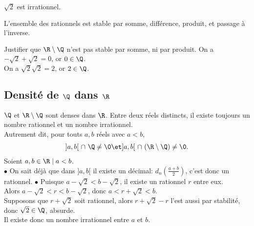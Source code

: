 \documentclass[11pt]{article}
\begin{document}
\vspace*{-0.5cm}

\begin{prop}{}{}
    $\sqrt{2}$ est irrationnel.
\end{prop}

\vspace*{-0.5cm}

\begin{prop}{}{}
    L'ensemble des rationnels est stable par somme, différence, produit, et passage à l'inverse.
\end{prop}

\vspace*{-0.5cm}

\begin{ex}{}{}
    Justifier que $\R\setminus\Q$ n'est pas stable par somme, ni par produit.
    \tcblower
    On a $-\sqrt{2}+\sqrt{2}=0$, or $0\in\Q$.\\
    On a $\sqrt{2}\sqrt{2}=2$, or $2\in\Q$.
\end{ex}

\subsection{Densité de \texorpdfstring{$\Q$}{Lg} dans \texorpdfstring{$\R$}{Lg}}

\begin{thm}{$\Q$ et $\R\setminus\Q$ sont denses dans $\R$.}{}
    Entre deux réels distincts, il existe toujours un nombre rationnel et un nombre irrationnel.\\
    Autrement dit, pour touts $a,b$ réels avec $a<b$,
    \begin{equation*}
        ]a,b[~\cap~\Q\neq\0\et]a,b[~\cap~(\R\setminus\Q)\neq\0.
    \end{equation*}
    \tcblower
    Soient $a,b\in\R\mid a<b$.\\
    $\bullet$ On sait déjà que dans $]a,b[$ il existe un décimal: $d_n(\frac{a+b}{2})$, c'est donc un rationnel.\n
    $\bullet$ Puisque $a-\sqrt{2}<b-\sqrt{2}$, il existe un rationnel $r$ entre eux.\\
    Alors $a-\sqrt{2}<r<b-\sqrt{2}$, donc $a<r+\sqrt{2}<b$.\\
    Supposons que $r+\sqrt{2}$ soit rationnel, alors $r+\sqrt{2}-r$ l'est aussi par stabilité, donc $\sqrt{2}\in\Q$, absurde.\\
    Il existe donc un nombre irrationnel entre $a$ et $b$.
\end{thm}
\end{document}
